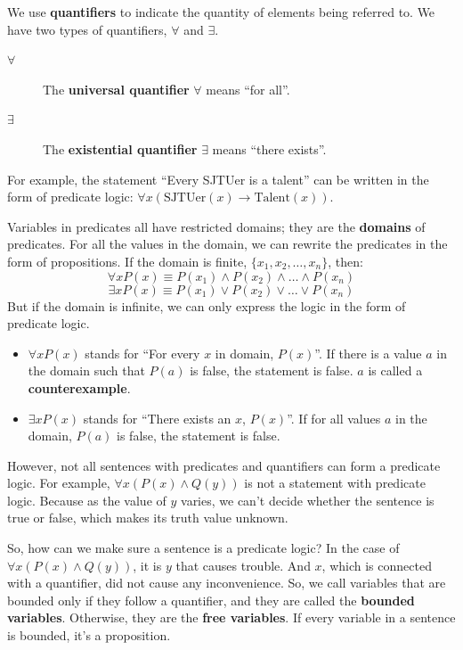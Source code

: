 \documentclass[oneside]{book}
\begin{document}
\begin{definition}[Quantifiers]
We use \textbf{quantifiers} to indicate the quantity of elements being referred to. We have two types of quantifiers, $\forall$ and $\exists$.
\begin{description}
    \item[$\forall$] The \textbf{universal quantifier} $\forall$ means “for all”.
    \item[$\exists$] The \textbf{existential quantifier} $\exists$ means “there exists”.
\end{description}
\end{definition}

For example, the statement “Every SJTUer is a talent” can be written in the form of predicate logic: $\forall x (\text{SJTUer}(x) \to \text{Talent}(x))$.

Variables in predicates all have restricted domains; they are the \textbf{domains} of predicates. For all the values in the domain, we can rewrite the predicates in the form of propositions. If the domain is finite, $\{x_1, x_2, \dots, x_n\}$, then:
$$ \forall x P(x) \equiv P(x_1) \wedge P(x_2) \wedge \dots \wedge P(x_n) $$
$$ \exists x P(x) \equiv P(x_1) \vee P(x_2) \vee \dots \vee P(x_n) $$
But if the domain is infinite, we can only express the logic in the form of predicate logic.
\begin{itemize}
    \item $\forall x P(x)$ stands for “For every $x$ in domain, $P(x)$”. If there is a value $a$ in the domain such that $P(a)$ is false, the statement is false. $a$ is called a \textbf{counterexample}.
    \item $\exists x P(x)$ stands for “There exists an $x$, $P(x)$”. If for all values $a$ in the domain, $P(a)$ is false, the statement is false.
\end{itemize}

However, not all sentences with predicates and quantifiers can form a predicate logic. For example, $\forall x (P(x) \wedge Q(y))$ is not a statement with predicate logic. Because as the value of $y$ varies, we can’t decide whether the sentence is true or false, which makes its truth value unknown.

So, how can we make sure a sentence is a predicate logic? In the case of $\forall x (P(x) \wedge Q(y))$, it is $y$ that causes trouble. And $x$, which is connected with a quantifier, did not cause any inconvenience. So, we call variables that are bounded only if they follow a quantifier, and they are called the \textbf{bounded variables}. Otherwise, they are the \textbf{free variables}. If every variable in a sentence is bounded, it’s a proposition.
\end{document}
